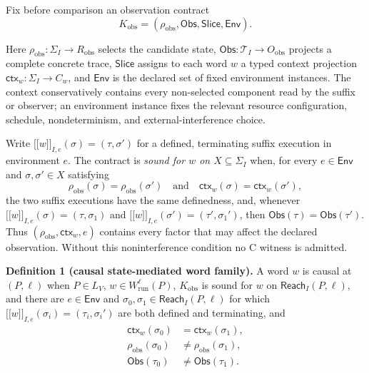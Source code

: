 \documentclass[conference]{IEEEtran}
\newcommand{\sem}[1]{\mathopen{[\![}#1\mathclose{]\!]}}
\begin{document}
Fix before comparison an observation contract
\begin{equation}
K_{\mathrm{obs}}=(\rho_{\mathrm{obs}},\mathsf{Obs},\mathsf{Slice},\mathsf{Env}).
\end{equation}

Here $\rho_{\mathrm{obs}}:\Sigma_I\to R_{\mathrm{obs}}$ selects the candidate state, $\mathsf{Obs}:\mathcal T_I\to O_{\mathrm{obs}}$ projects a complete concrete trace, $\mathsf{Slice}$ assigns to each word $w$ a typed context projection $\mathsf{ctx}_w:\Sigma_I\to C_w$, and $\mathsf{Env}$ is the declared set of fixed environment instances. The context conservatively contains every non-selected component read by the suffix or observer; an environment instance fixes the relevant resource configuration, schedule, nondeterminism, and external-interference choice.

Write $\sem{w}_{I,e}(\sigma)=(\tau,\sigma')$ for a defined, terminating suffix execution in environment $e$. The contract is \emph{sound for $w$ on $X\subseteq\Sigma_I$} when, for every $e\in\mathsf{Env}$ and $\sigma,\sigma'\in X$ satisfying
\begin{equation}
\rho_{\mathrm{obs}}(\sigma)=\rho_{\mathrm{obs}}(\sigma')
\quad\text{and}\quad
\mathsf{ctx}_w(\sigma)=\mathsf{ctx}_w(\sigma'),
\end{equation}
the two suffix executions have the same definedness, and, whenever
$\sem{w}_{I,e}(\sigma)=(\tau,\sigma_1)$ and
$\sem{w}_{I,e}(\sigma')=(\tau',\sigma_1')$, then
$\mathsf{Obs}(\tau)=\mathsf{Obs}(\tau')$. Thus $(\rho_{\mathrm{obs}},\mathsf{ctx}_w,e)$ contains every factor that may affect the declared observation. Without this noninterference condition no C witness is admitted.

\medskip
\noindent\textbf{Definition 1 (causal state-mediated word family).}
A word $w$ is causal at $(P,\ell)$ when $P\in L_V$, $w\in W^\ell_{\mathrm{run}}(P)$, $K_{\mathrm{obs}}$ is sound for $w$ on $\mathsf{Reach}_I(P,\ell)$, and there are $e\in\mathsf{Env}$ and $\sigma_0,\sigma_1\in\mathsf{Reach}_I(P,\ell)$ for which $\sem{w}_{I,e}(\sigma_i)=(\tau_i,\sigma_i')$ are both defined and terminating, and
\begin{equation}
\begin{aligned}
\mathsf{ctx}_w(\sigma_0)&=\mathsf{ctx}_w(\sigma_1),\\
\rho_{\mathrm{obs}}(\sigma_0)&\ne\rho_{\mathrm{obs}}(\sigma_1),\\
\mathsf{Obs}(\tau_0)&\ne\mathsf{Obs}(\tau_1).
\end{aligned}
\end{equation}
\end{document}
